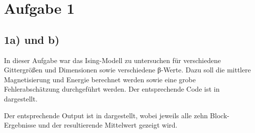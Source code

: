 \section*{Aufgabe 1}
\subsection*{1a) und b)}
In dieser Aufgabe war das Ising-Modell zu untersuchen für verschiedene Gittergrößen
und Dimensionen sowie verschiedene β-Werte. Dazu soll die mittlere Magnetisierung 
und Energie berechnet werden sowie eine grobe Fehlerabschätzung durchgeführt werden.
Der entsprechende Code ist in  dargestellt.



Der entsprechende Output ist in  dargestellt, wobei jeweils alle
zehn Block-Ergebnisse und der resultierende Mittelwert gezeigt wird.


